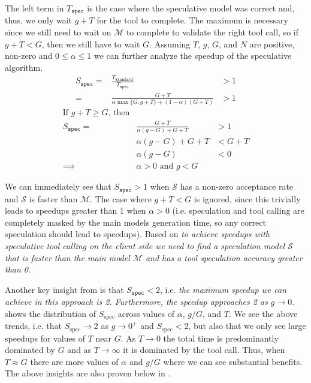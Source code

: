 The left term in $T_{\mathtt{spec}}$ is the case where the speculative model was correct and, thus, we only wait $g+T$ for the tool to complete.
The maximum is necessary since we still need to wait on $\mathcal{M}$ to complete to validate the right tool call, so if $g+T<G$, then we still have to wait $G$.
Assuming $T$, $g$, $G$, and $N$ are positive, non-zero and $0\le\alpha\le1$ we can further analyze the speedup of the speculative algorithm.
\begin{align}
    S_{\mathtt{spec}} =& \frac{T_{\mathtt{standard}}}{T_{\mathtt{spec}}} &> 1 \nonumber \\
  =& \frac{G + T}{\alpha \max\{G, g+T\} + (1-\alpha)(G+T)} &> 1 \label{eq:client-alg-speedup}
\end{align}
\begin{align}
  \text{If $g+T \ge G$, then} \nonumber \\
  S_{\mathtt{spec}} =& \frac{G+T}{\alpha(g-G)+G+T} &> 1 \nonumber \\
  & \alpha(g-G)+G+T &< G+T  \nonumber \\
  & \alpha(g-G) &<0\nonumber \\
    \implies & \alpha > 0 \textrm{ and } g < G \label{eq:client-alg-condition}
\end{align}


We can immediately see that $S_{\mathtt{spec}}>1$ when $\mathcal{S}$ has a non-zero acceptance rate and $\mathcal{S}$ is faster than $\mathcal{M}$. 
The case where $g+T<G$ is ignored, since this trivially leads to speedups greater than 1 when $\alpha>0$ (i.e. speculation and tool calling are completely masked by the main models generation time, so any correct speculation should lead to speedups).
Based on  \emph{to achieve speedups with speculative tool calling on the client side we need to find a speculation model $\mathcal{S}$ that is faster than the main model $\mathcal{M}$ and has a tool speculation accuracy greater than 0}.

Another key insight from  is that $S_{\mathtt{spec}} < 2$, i.e. \emph{the maximum speedup we can achieve in this approach is 2.
Furthermore, the speedup approaches 2 as $g\rightarrow 0$}.
 shows the distribution of $S_{\textrm{spec}}$ across values of $\alpha$, $g/G$, and $T$.
We see the above trends, i.e. that $S_{\textrm{spec}}\rightarrow 2$ as $g\rightarrow 0^+$ and $S_{\textrm{spec}}<2$, but also that we only see large speedups for values of $T$ near $G$.
As $T\rightarrow 0$ the total time is predominantly dominated by $G$ and as $T\rightarrow \infty$ it is dominated by the tool call.
Thus, when $T\approx G$ there are more values of $\alpha$ and $g/G$ where we can see substantial benefits.
The above insights are also proven below in .

